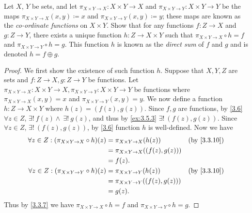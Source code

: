 \begin{ex}\label{ex:3.5.7}
	Let \(X\), \(Y\) be sets, and let \(\pi_{X \times Y \to X} : X \times Y \to X\) and \(\pi_{X \times Y \to Y} : X \times Y \to Y\) be the maps \(\pi_{X \times Y \to X}(x, y) \coloneqq x\) and \(\pi_{X \times Y \to Y}(x, y) \coloneqq y\);
	these maps are known as the \emph{co-ordinate functions} on \(X \times Y\).
	Show that for any functions \(f : Z \to X\) and \(g : Z \to Y\), there exists a unique function \(h : Z \to X \times Y\) such that \(\pi_{X \times Y \to X} \circ h = f\) and \(\pi_{X \times Y \to Y} \circ h = g\).
	This function \(h\) is known as the \emph{direct sum} of \(f\) and \(g\) and is denoted \(h = f \oplus g\).
\end{ex}

\begin{proof}
	We first show the existence of such function \(h\).
	Suppose that \(X, Y, Z\) are sets and \(f : Z \to X, g : Z \to Y\) be functions.
	Let \(\pi_{X \times Y \to X} : X \times Y \to X, \pi_{X \times Y \to Y} : X \times Y \to Y\) be functions where \(\pi_{X \times Y \to X}(x, y) = x\) and \(\pi_{X \times Y \to Y}(x, y) = y\).
	We now define a function \(h : Z \to X \times Y\) where \(h(z) = (f(z), g(z))\).
	Since \(f, g\) are functions, by \cref{3.6} \(\forall z \in Z\), \(\exists!\ f(z) \land \ \exists!\ g(z)\), and thus by \cref{ex:3.5.3} \(\exists!\ (f(z), g(z))\).
	Since \(\forall z \in Z\), \(\exists!\ (f(z), g(z))\), by \cref{3.6} function \(h\) is well-defined.
	Now we have
	\begin{align*}
		\forall z \in Z : (\pi_{X \times Y \to X} \circ h)(z) & = \pi_{X \times Y \to X}(h(z))         &  & \by{3.3.10} \\
		                                                      & = \pi_{X \times Y \to X}((f(z), g(z)))                  \\
		                                                      & = f(z).                                                 \\
		\forall z \in Z : (\pi_{X \times Y \to Y} \circ h)(z) & = \pi_{X \times Y \to Y}(h(z))         &  & \by{3.3.10} \\
		                                                      & = \pi_{X \times Y \to Y}((f(z), g(z)))                  \\
		                                                      & = g(z).
	\end{align*}
	Thus by \cref{3.3.7} we have \(\pi_{X \times Y \to X} \circ h = f\) and \(\pi_{X \times Y \to Y} \circ h = g\).


\end{proof}
